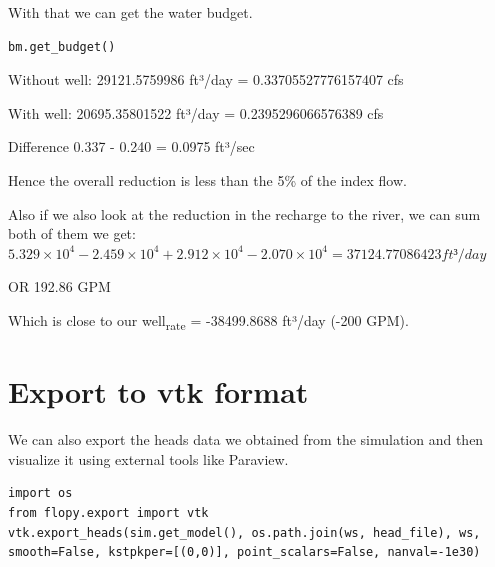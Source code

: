 \documentclass[titlepage,12pt]{unisubmission}
\begin{document}
With that we can get the water budget.
\begin{verbatim}
bm.get_budget()
\end{verbatim}

Without well:
29121.5759986 ft³/day = 0.33705527776157407 cfs

With well:
 20695.35801522 ft³/day = 0.2395296066576389 cfs

Difference 0.337 - 0.240 = 0.0975  ft³/sec

Hence the overall reduction is less than the 5\% of the index flow.

Also if we also look at the reduction in the recharge to the river, we can sum both of them we get:
\(5.329 \times 10^{4} - 2.459 \times 10^{4} + 2.912 \times 10^{4} - 2.070 \times 10^{4} = 37124.77086423 ft³/day\)

OR 192.86 GPM

Which is close to our well\textsubscript{rate} = -38499.8688 ft³/day (-200 GPM).

\section{Export to vtk format}
\label{sec:orga2bf30e}

We can also export the heads data we obtained from the simulation and then visualize it using external tools like Paraview.

\begin{verbatim}
import os
from flopy.export import vtk
vtk.export_heads(sim.get_model(), os.path.join(ws, head_file), ws, smooth=False, kstpkper=[(0,0)], point_scalars=False, nanval=-1e30)
\end{verbatim}
\end{document}
